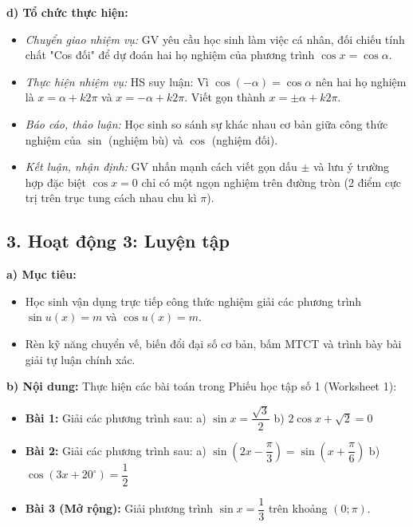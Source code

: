 \documentclass[12pt, a4paper]{article}
\begin{document}
\noindent \textbf{d) Tổ chức thực hiện:}  
\begin{itemize}[leftmargin=0.8cm]  
    \item \textit{Chuyển giao nhiệm vụ:} GV yêu cầu học sinh làm việc cá nhân, đối chiếu tính chất "Cos đối" để dự đoán hai họ nghiệm của phương trình $\cos x = \cos\alpha$.  
    \item \textit{Thực hiện nhiệm vụ:} HS suy luận: Vì $\cos(-\alpha) = \cos\alpha$ nên hai họ nghiệm là $x = \alpha + k2\pi$ và $x = -\alpha + k2\pi$. Viết gọn thành $x = \pm\alpha + k2\pi$.  
    \item \textit{Báo cáo, thảo luận:} Học sinh so sánh sự khác nhau cơ bản giữa công thức nghiệm của $\sin$ (nghiệm bù) và $\cos$ (nghiệm đối).  
    \item \textit{Kết luận, nhận định:} GV nhấn mạnh cách viết gọn dấu $\pm$ và lưu ý trường hợp đặc biệt $\cos x = 0$ chỉ có một ngọn nghiệm trên đường tròn (2 điểm cực trị trên trục tung cách nhau chu kì $\pi$).  
\end{itemize}  
  
\subsection*{3. Hoạt động 3: Luyện tập}  
  
\noindent \textbf{a) Mục tiêu:}  
\begin{itemize}[leftmargin=0.8cm]  
    \item Học sinh vận dụng trực tiếp công thức nghiệm giải các phương trình $\sin u(x) = m$ và $\cos u(x) = m$.  
    \item Rèn kỹ năng chuyển vế, biến đổi đại số cơ bản, bấm MTCT và trình bày bài giải tự luận chính xác.  
\end{itemize}  
  
\noindent \textbf{b) Nội dung:}  
Thực hiện các bài toán trong Phiếu học tập số 1 (Worksheet 1):  
\begin{itemize}[leftmargin=0.6cm]  
    \item \textbf{Bài 1:} Giải các phương trình sau:  
    a) $\sin x = \dfrac{\sqrt{3}}{2}$ \qquad b) $2\cos x + \sqrt{2} = 0$  
    \item \textbf{Bài 2:} Giải các phương trình sau:  
    a) $\sin\left(2x - \dfrac{\pi}{3}\right) = \sin\left(x + \dfrac{\pi}{6}\right)$ \qquad b) $\cos\left(3x + 20^\circ\right) = \dfrac{1}{2}$  
    \item \textbf{Bài 3 (Mở rộng):} Giải phương trình $\sin x = \dfrac{1}{3}$ trên khoảng $(0; \pi)$.  
\end{itemize}  
  
\end{document}
